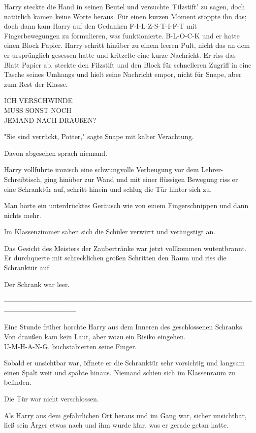 {Harry steckte die Hand in seinen Beutel und versuchte 'Filzstift' zu sagen, doch natürlich kamen keine Worte heraus. Für einen kurzen Moment stoppte ihn das; doch dann kam Harry auf den Gedanken F-I-L-Z-S-T-I-F-T mit Fingerbewegungen zu formulieren, was funktionierte. B-L-O-C-K und er hatte einen Block Papier. Harry schritt hinüber zu einem leeren Pult, nicht das an dem er ursprünglich gesessen hatte und kritzelte eine kurze Nachricht. Er riss das Blatt Papier ab, steckte den Filzstift und den Block für schnelleren Zugriff in eine Tasche seines Umhangs und hielt seine Nachricht empor, nicht für Snape, aber zum Rest der Klasse.

ICH VERSCHWINDE\\ MUSS SONST NOCH\\ JEMAND NACH DRAUßEN?

"Sie sind verrückt, Potter," sagte Snape mit kalter Verachtung.

Davon abgesehen sprach niemand.

Harry vollführte ironisch eine schwungvolle Verbeugung vor dem Lehrer-Schreibtisch, ging hinüber zur Wand und mit einer flüssigen Bewegung riss er eine Schranktür auf, schritt hinein und schlug die Tür hinter sich zu.

Man hörte ein unterdrücktes Geräusch wie von einem Fingerschnippen und dann nichts mehr.

Im Klassenzimmer sahen sich die Schüler verwirrt und verängstigt an.

Das Gesicht des Meisters der Zaubertränke war jetzt vollkommen wutentbrannt. Er durchquerte mit schrecklichen großen Schritten den Raum und riss die Schranktür auf.

Der Schrank war leer.

--------------------------------------------------------------------------------------------------------------------------------------------

Eine Stunde früher horchte Harry aus dem Inneren des geschlossenen Schranks. Von draußen kam kein Laut, aber wozu ein Risiko eingehen.\\ U-M-H-A-N-G, buchstabierten seine Finger.

Sobald er unsichtbar war, öffnete er die Schranktür sehr vorsichtig und langsam einen Spalt weit und spähte hinaus. Niemand schien sich im Klassenraum zu befinden.

Die Tür war nicht verschlossen.

Als Harry aus dem gefährlichen Ort heraus und im Gang war, sicher unsichtbar, ließ sein Ärger etwas nach und ihm wurde klar, was er gerade getan hatte.

}

